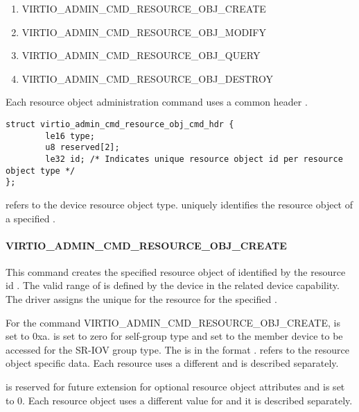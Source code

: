 \begin{enumerate}
\item VIRTIO_ADMIN_CMD_RESOURCE_OBJ_CREATE
\item VIRTIO_ADMIN_CMD_RESOURCE_OBJ_MODIFY
\item VIRTIO_ADMIN_CMD_RESOURCE_OBJ_QUERY
\item VIRTIO_ADMIN_CMD_RESOURCE_OBJ_DESTROY
\end{enumerate}

Each resource object administration command uses a common header
.

\begin{lstlisting}
struct virtio_admin_cmd_resource_obj_cmd_hdr {
        le16 type;
        u8 reserved[2];
        le32 id; /* Indicates unique resource object id per resource object type */
};

\end{lstlisting}

 refers to the device resource object type.
 uniquely identifies the resource object of a specified .

\paragraph{VIRTIO_ADMIN_CMD_RESOURCE_OBJ_CREATE}
\label{par:Basic Facilities of a Virtio Device / Device groups / Group administration commands / Device resource objects / VIRTIO-ADMIN-CMD-RESOURCE-OBJ-CREATE}

This command creates the specified resource object of  identified by the
resource id . The valid range of  is defined by the
device in the related device capability. The driver assigns the unique 
for the resource for the specified .

For the command VIRTIO_ADMIN_CMD_RESOURCE_OBJ_CREATE,  is set to 0xa.
 is set to zero for self-group type and set to
the member device to be accessed for the SR-IOV group type.
The  is in the format
.
 refers to the resource object specific data.
Each resource uses a different  and is described
separately.

 is reserved for future extension for optional resource object attributes and
is set to 0. Each resource object uses a different value for
 and it is described separately.

